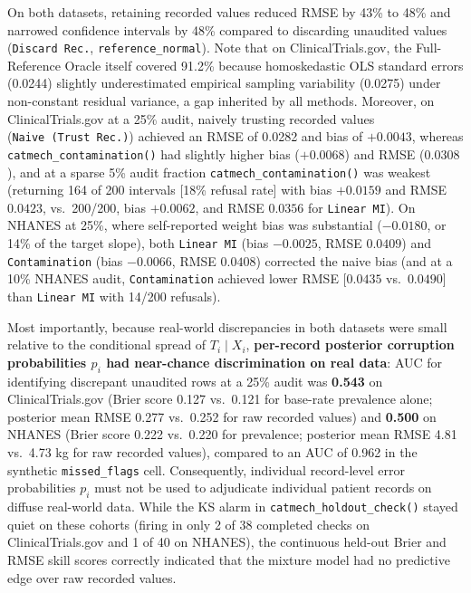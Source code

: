 \documentclass[
]{article}
\begin{document}
On both datasets, retaining recorded values reduced RMSE by 43\% to 48\%
and narrowed confidence intervals by 48\% compared to discarding
unaudited values (\texttt{Discard\ Rec.}, \texttt{reference\_normal}).
Note that on ClinicalTrials.gov, the Full-Reference Oracle itself
covered 91.2\% because homoskedastic OLS standard errors (0.0244)
slightly underestimated empirical sampling variability (0.0275) under
non-constant residual variance, a gap inherited by all methods.
Moreover, on ClinicalTrials.gov at a 25\% audit, naively trusting
recorded values (\texttt{Naive\ (Trust\ Rec.)}) achieved an RMSE of
0.0282 and bias of \(+0.0043\), whereas
\texttt{catmech\_contamination()} had slightly higher bias (\(+0.0068\))
and RMSE (\(0.0308\)), and at a sparse 5\% audit fraction
\texttt{catmech\_contamination()} was weakest (returning 164 of 200
intervals {[}18\% refusal rate{]} with bias \(+0.0159\) and RMSE
\(0.0423\), vs.~200/200, bias \(+0.0062\), and RMSE \(0.0356\) for
\texttt{Linear\ MI}). On NHANES at 25\%, where self-reported weight bias
was substantial (\(-0.0180\), or 14\% of the target slope), both
\texttt{Linear\ MI} (bias \(-0.0025\), RMSE \(0.0409\)) and
\texttt{Contamination} (bias \(-0.0066\), RMSE \(0.0408\)) corrected the
naive bias (and at a 10\% NHANES audit, \texttt{Contamination} achieved
lower RMSE {[}\(0.0435\) vs.~\(0.0490\){]} than \texttt{Linear\ MI} with
14/200 refusals).

Most importantly, because real-world discrepancies in both datasets were
small relative to the conditional spread of \(T_i \mid X_i\),
\textbf{per-record posterior corruption probabilities \(p_i\) had
near-chance discrimination on real data}: AUC for identifying discrepant
unaudited rows at a 25\% audit was \textbf{0.543} on ClinicalTrials.gov
(Brier score 0.127 vs.~0.121 for base-rate prevalence alone; posterior
mean RMSE 0.277 vs.~0.252 for raw recorded values) and \textbf{0.500} on
NHANES (Brier score 0.222 vs.~0.220 for prevalence; posterior mean RMSE
4.81 vs.~4.73 kg for raw recorded values), compared to an AUC of 0.962
in the synthetic \texttt{missed\_flags} cell. Consequently, individual
record-level error probabilities \(p_i\) must not be used to adjudicate
individual patient records on diffuse real-world data. While the KS
alarm in \texttt{catmech\_holdout\_check()} stayed quiet on these
cohorts (firing in only 2 of 38 completed checks on ClinicalTrials.gov
and 1 of 40 on NHANES), the continuous held-out Brier and RMSE skill
scores correctly indicated that the mixture model had no predictive edge
over raw recorded values.
\end{document}
